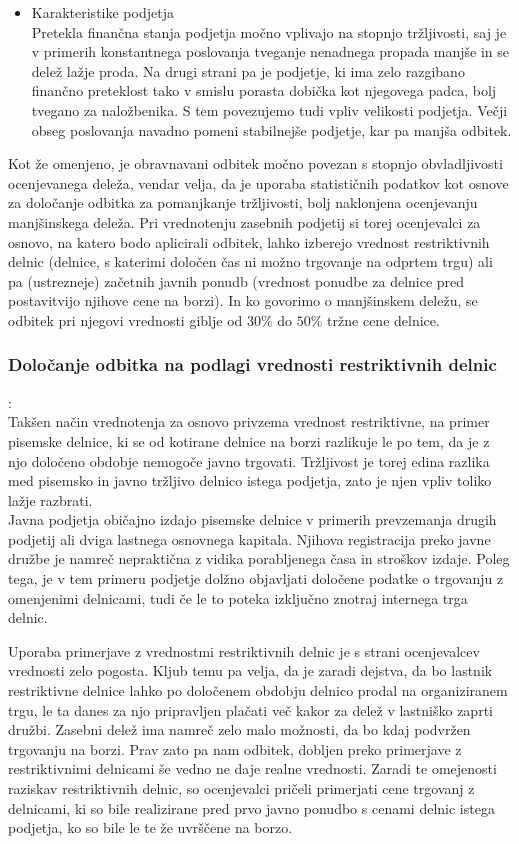 \documentclass[12pt,a4paper]{amsart}
\theoremstyle{definition} %
\theoremstyle{plain} %
\begin{document}
\begin{itemize}
\item Karakteristike podjetja\\
Pretekla finančna stanja podjetja močno vplivajo na stopnjo tržljivosti, saj je v primerih konstantnega poslovanja tveganje nenadnega propada manjše in se delež lažje proda. Na drugi strani pa je podjetje, ki ima zelo razgibano finančno preteklost tako v smislu porasta dobička kot njegovega padca, bolj tvegano za naložbenika. S tem povezujemo tudi vpliv velikosti podjetja. Večji obseg poslovanja navadno pomeni stabilnejše podjetje, kar pa manjša odbitek. 
\end{itemize}
Kot že omenjeno, je obravnavani odbitek močno povezan s stopnjo obvladljivosti ocenjevanega deleža, vendar velja, da je uporaba statističnih podatkov kot osnove za določanje odbitka za pomanjkanje tržljivosti, bolj naklonjena ocenjevanju manjšinskega deleža. Pri vrednotenju zasebnih podjetij si torej ocenjevalci za osnovo, na katero bodo aplicirali odbitek, lahko izberejo vrednost restriktivnih delnic (delnice, s katerimi določen čas ni možno trgovanje na odprtem trgu) ali pa (ustrezneje) začetnih javnih ponudb (vrednost ponudbe za delnice pred postavitvijo njihove cene na borzi). In ko govorimo o manjšinskem deležu, se odbitek pri njegovi vrednosti giblje od $30\%$ do $50\%$ tržne cene delnice.

\subsubsection{Določanje odbitka na podlagi vrednosti restriktivnih delnic}:\\

Takšen način vrednotenja za osnovo privzema vrednost restriktivne, na primer pisemske delnice, ki se od kotirane delnice na borzi razlikuje le po tem, da je z njo določeno obdobje nemogoče javno trgovati. Tržljivost je torej edina razlika med pisemsko in javno tržljivo delnico istega podjetja, zato je njen vpliv toliko lažje razbrati.\\
Javna podjetja običajno izdajo pisemske delnice v primerih prevzemanja drugih podjetij ali dviga lastnega osnovnega kapitala. Njihova registracija preko javne družbe je namreč nepraktična z vidika porabljenega časa in stroškov izdaje. Poleg tega, je v tem primeru podjetje dolžno objavljati določene podatke o trgovanju z omenjenimi delnicami, tudi če le to poteka izključno znotraj internega trga delnic. \par
Uporaba primerjave z vrednostmi restriktivnih delnic je s strani ocenjevalcev vrednosti zelo pogosta. Kljub temu pa velja, da je zaradi dejstva, da bo lastnik restriktivne delnice lahko po določenem obdobju delnico prodal na organiziranem trgu, le ta danes za njo pripravljen plačati več kakor za delež v lastniško zaprti družbi. Zasebni delež ima namreč zelo malo možnosti, da bo kdaj podvržen trgovanju na borzi. Prav zato pa nam odbitek, dobljen preko primerjave z restriktivnimi delnicami še vedno ne daje realne vrednosti. Zaradi te omejenosti raziskav restriktivnih delnic, so ocenjevalci pričeli primerjati cene trgovanj z delnicami, ki so bile realizirane pred prvo javno ponudbo s cenami delnic istega podjetja, ko so bile le te že uvrščene na borzo.
\end{document}
